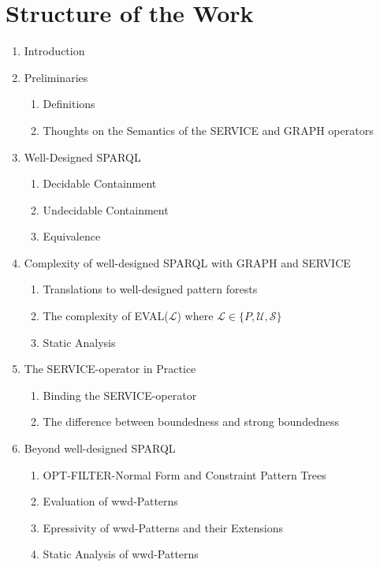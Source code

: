 \section{Structure of the Work}
\begin{enumerate}
	\item Introduction
	\item Preliminaries
		\begin{enumerate}
			\item Definitions
			\item Thoughts on the Semantics of the SERVICE and GRAPH operators
		\end{enumerate}
	\item Well-Designed SPARQL
		\begin{enumerate}
			\item Decidable Containment
			\item Undecidable Containment
			\item Equivalence
		\end{enumerate}
	\item Complexity of well-designed SPARQL with GRAPH and SERVICE
		\begin{enumerate}
			\item Translations to well-designed pattern forests
			\item The complexity of EVAL($\mathcal{L}$) where $\mathcal{L} \in \{
				P, \mathcal{U}, \mathcal{S} \}$
			\item Static Analysis
		\end{enumerate}
	\item The SERVICE-operator in Practice
		\begin{enumerate}
			\item Binding the SERVICE-operator
			\item The difference between boundedness and strong boundedness
		\end{enumerate}
	\item Beyond well-designed SPARQL
		\begin{enumerate}
			\item OPT-FILTER-Normal Form and Constraint Pattern Trees
			\item Evaluation of wwd-Patterns
			\item Epressivity of wwd-Patterns and their Extensions
			\item Static Analysis of wwd-Patterns
		\end{enumerate}
\end{enumerate}

